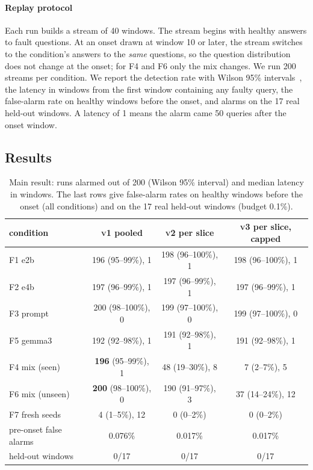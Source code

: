 \documentclass{article}
\newcommand{\vone}{\textsc{v1}}
\newcommand{\vtwo}{\textsc{v2}}
\newcommand{\vthree}{\textsc{v3}}
\begin{document}
\paragraph{Replay protocol}
Each run builds a stream of 40 windows. The stream begins with healthy answers to
fault questions. At an onset drawn at window 10 or later, the stream switches to
the condition's answers to the \emph{same} questions, so the question
distribution does not change at the onset; for F4 and F6 only the mix changes.
We run 200 streams per condition. We report the detection rate with Wilson 95\%
intervals~\citep{wilson1927probable}, the latency in windows from the first window
containing any faulty query, the false-alarm rate on healthy windows before the
onset, and alarms on the 17 real held-out windows. A latency of 1 means the alarm
came 50 queries after the onset window.

\subsection{Results}
\label{app:fixed-results}

\begin{table}[t]
  \centering\small
  \caption{Main result: runs alarmed out of 200 (Wilson 95\% interval) and median
  latency in windows. The last rows give false-alarm rates on healthy windows before
  the onset (all conditions) and on the 17 real held-out windows (budget 0.1\%).}
  \label{tab:main}
  \setlength{\tabcolsep}{5pt}
  \begin{tabular}{lccc}
    \toprule
    condition & \vone{} pooled & \vtwo{} per slice & \vthree{} per slice, capped \\
    \midrule
    F1 e2b & 196 (95--99\%), 1 & 198 (96--100\%), 1 & 198 (96--100\%), 1 \\
    F2 e4b & 197 (96--99\%), 1 & 197 (96--99\%), 1 & 197 (96--99\%), 1 \\
    F3 prompt & 200 (98--100\%), 0 & 199 (97--100\%), 0 & 199 (97--100\%), 0 \\
    F5 gemma3 & 192 (92--98\%), 1 & 191 (92--98\%), 1 & 191 (92--98\%), 1 \\
    \midrule
    F4 mix (seen) & \textbf{196} (95--99\%), 1 & 48 (19--30\%), 8 & 7 (2--7\%), 5 \\
    F6 mix (unseen) & \textbf{200} (98--100\%), 0 & 190 (91--97\%), 3 & 37 (14--24\%), 12 \\
    F7 fresh seeds & 4 (1--5\%), 12 & 0 (0--2\%) & 0 (0--2\%) \\
    \midrule
    pre-onset false alarms & 0.076\% & 0.017\% & 0.017\% \\
    held-out windows & 0/17 & 0/17 & 0/17 \\
    \bottomrule
  \end{tabular}
\end{table}
\end{document}

